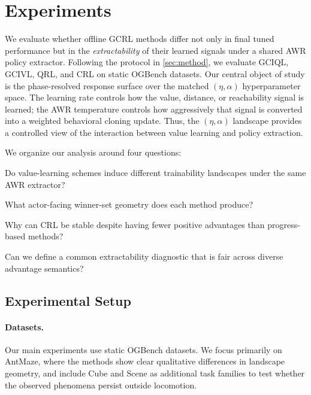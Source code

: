 \section{Experiments}
\label{sec:experiments}

We evaluate whether offline GCRL methods differ not only in final tuned performance but in the \emph{extractability} of their learned signals under a shared AWR policy extractor.
Following the protocol in \cref{sec:method}, we evaluate GCIQL, GCIVL, QRL, and CRL on static OGBench datasets. Our central object of study is the phase-resolved response surface over the matched \((\eta,\alpha)\) hyperparameter space.
The learning rate controls how the value, distance, or reachability signal is learned; the AWR temperature controls how aggressively that signal is converted into a weighted behavioral cloning update.
Thus, the \((\eta,\alpha)\) landscape provides a controlled view of the interaction between value learning and policy extraction.

We organize our analysis around four questions:
\begin{inparaenum}[(i)]
    \item Do value-learning schemes induce different trainability landscapes under the same AWR extractor?
    \item What actor-facing winner-set geometry does each method produce?
    \item Why can CRL be stable despite having fewer positive advantages than progress-based methods?
    \item Can we define a common extractability diagnostic that is fair across diverse advantage semantics?
\end{inparaenum}

\subsection{Experimental Setup}
\label{sec:experiments:setup}

\paragraph{Datasets.}
Our main experiments use static OGBench datasets. We focus primarily on AntMaze, where the methods show clear qualitative differences in landscape geometry, and include Cube and Scene as additional task families to test whether the observed phenomena persist outside locomotion.


